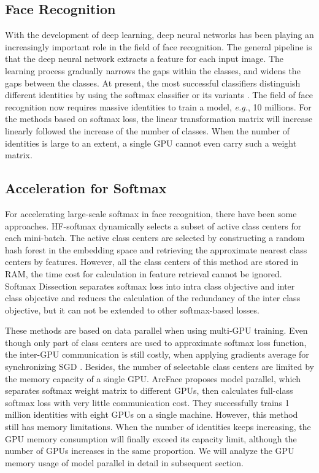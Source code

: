\documentclass[letterpaper]{article} \usepackage{style/aaai21}  \usepackage{times}  \usepackage{helvet} \usepackage{courier}  \usepackage[hyphens]{url}  \usepackage{graphicx} \usepackage{color}
\begin{document}
\subsection{Face Recognition}
With the development of deep learning, deep neural networks has been playing an increasingly important role in the field of face recognition. The general pipeline is that the deep neural network extracts a feature for each input image. The learning process gradually narrows the gaps within the classes, and widens the gaps between the classes. At present, the most successful classifiers distinguish different identities by using the softmax classifier or its variants \cite{wang2018cosface,deng2019arcface,liu2017sphereface}. The field of face recognition now requires massive identities to train a model, \emph{e.g.}, 10 millions. For the methods based on softmax loss, the linear transformation matrix  will increase linearly followed the increase of the number of classes. When the number of identities is large to an extent, a single GPU cannot even carry such a weight matrix.  

    \subsection{Acceleration for Softmax} For accelerating large-scale softmax in face recognition, there have been some approaches. HF-softmax \cite{goodman2001classes} dynamically selects a subset of active class centers for each mini-batch. The active class centers are selected by constructing a random hash forest in the embedding space and retrieving the approximate nearest class centers by features. However, all the class centers of this method are stored in RAM, the time cost for calculation in feature retrieval cannot be ignored. Softmax Dissection \cite{he2020softmax}  separates softmax loss into intra class objective and inter class objective and reduces the calculation of the redundancy of the inter class objective, but it can not be extended to other softmax-based losses. 

These methods are based on data parallel when using multi-GPU training. Even though only part of class centers are used to approximate softmax loss function, the inter-GPU communication is still costly, when applying gradients average for synchronizing SGD \cite{li2014scaling}. Besides, the number of selectable class centers are limited by the memory capacity of a single GPU. ArcFace \cite{deng2019arcface} proposes model parallel, which separates softmax weight matrix to different GPUs, then calculates full-class softmax loss with very little communication cost. They successfully trains 1 million identities with eight GPUs on a single machine. However, this method still has memory limitations. When the number of identities keeps increasing, the GPU memory consumption 
will finally exceed its capacity limit, although the number of GPUs increases in the same proportion. We will analyze the GPU memory usage of model parallel in detail in subsequent section. 
\end{document}
